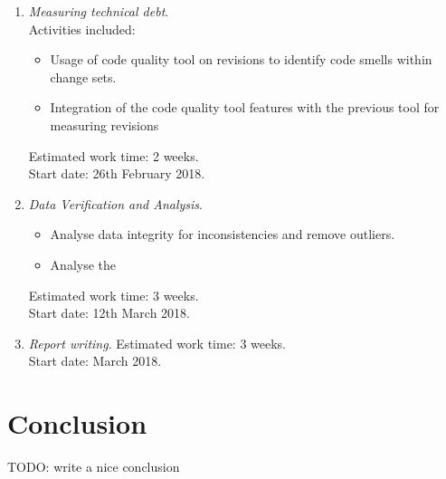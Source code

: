\documentclass{mprop}
\begin{document}
\begin{enumerate}
	\item \textit{Measuring technical debt}.\\
	Activities included:
	\begin{itemize}
		\item Usage of code quality tool on revisions to identify code smells
		within change sets.
		\item Integration of the code quality tool features with the previous
		tool for measuring revisions 
	\end{itemize}

	Estimated work time: 2 weeks.\\
	Start date: 26th February 2018.

	\item \textit{Data Verification and Analysis}.\\
	\begin{itemize}
		\item Analyse data integrity for inconsistencies and remove outliers.
		\item Analyse the 
	\end{itemize}

	Estimated work time: 3 weeks.\\
	Start date: 12th March 2018.

	\item \textit{Report writing}.
	Estimated work time: 3 weeks.\\
	Start date:  March 2018.
\end{enumerate}


\section{Conclusion}

TODO: write a nice conclusion

\pagebreak


\end{document}
